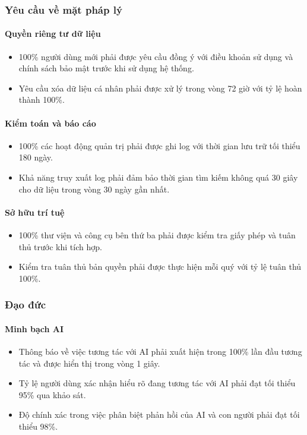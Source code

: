 \subsubsection{Yêu cầu về mặt pháp lý}

\paragraph{Quyền riêng tư dữ liệu}
\begin{itemize}
    \item 100\% người dùng mới phải được yêu cầu đồng ý với điều khoản sử dụng và chính sách bảo mật trước khi sử dụng hệ thống. 
    \item Yêu cầu xóa dữ liệu cá nhân phải được xử lý trong vòng 72 giờ với tỷ lệ hoàn thành 100\%.
\end{itemize}

\paragraph{Kiểm toán và báo cáo}
\begin{itemize}
    \item 100\% các hoạt động quản trị phải được ghi log với thời gian lưu trữ tối thiểu 180 ngày. 
    \item Khả năng truy xuất log phải đảm bảo thời gian tìm kiếm không quá 30 giây cho dữ liệu trong vòng 30 ngày gần nhất. 
\end{itemize}

\paragraph{Sở hữu trí tuệ}
\begin{itemize}
    \item 100\% thư viện và công cụ bên thứ ba phải được kiểm tra giấy phép và tuân thủ trước khi tích hợp. 
    \item Kiểm tra tuân thủ bản quyền phải được thực hiện mỗi quý với tỷ lệ tuân thủ 100\%.
\end{itemize}

\subsubsection{Đạo đức}

\paragraph{Minh bạch AI}
\begin{itemize}
    \item Thông báo về việc tương tác với AI phải xuất hiện trong 100\% lần đầu tương tác và được hiển thị trong vòng 1 giây. 
    \item Tỷ lệ người dùng xác nhận hiểu rõ đang tương tác với AI phải đạt tối thiểu 95\% qua khảo sát. 
    \item Độ chính xác trong việc phân biệt phản hồi của AI và con người phải đạt tối thiểu 98\%. 
\end{itemize}

